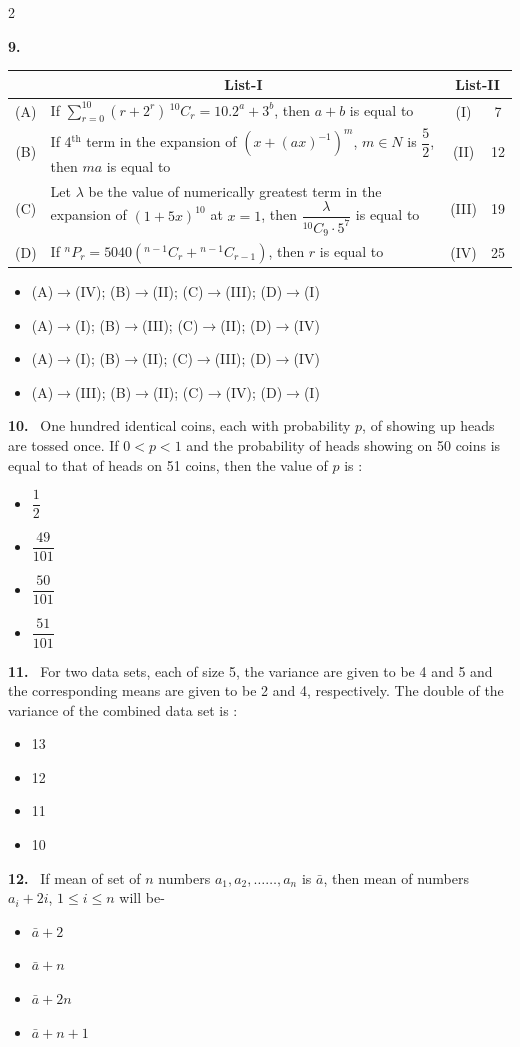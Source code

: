 \documentclass[10pt]{extarticle}
\newcommand{\qn}[1]{\par\smallskip\noindent\textbf{#1.}~}
\newenvironment{qoptions}{\begin{itemize}[leftmargin=1.8em,itemsep=1pt,topsep=2pt,label={}]}{\end{itemize}}
\newcommand{\opt}[2]{\item[(#1)] #2}
\begin{document}
\begin{multicols}{2}
\qn{9}
\begin{center}
\begin{tabular}{|c|p{4.2cm}|c|c|}
\hline
 & \multicolumn{1}{c|}{\textbf{List-I}} & \multicolumn{2}{c|}{\textbf{List-II}}\\
\hline
(A) & If $\displaystyle\sum_{r=0}^{10}(r+2^r)\,{}^{10}C_r=10.2^a+3^b$, then $a+b$ is equal to & (I) & 7\\
\hline
(B) & If 4$^{\text{th}}$ term in the expansion of $(x+(ax)^{-1})^m$, $m\in N$ is $\dfrac52$, then $ma$ is equal to & (II) & 12\\
\hline
(C) & Let $\lambda$ be the value of numerically greatest term in the expansion of $(1+5x)^{10}$ at $x=1$, then $\dfrac{\lambda}{{}^{10}C_9\cdot5^7}$ is equal to & (III) & 19\\
\hline
(D) & If ${}^nP_r=5040\left({}^{n-1}C_r+{}^{n-1}C_{r-1}\right)$, then $r$ is equal to & (IV) & 25\\
\hline
\end{tabular}
\end{center}
\begin{qoptions}
\opt{A}{(A)$\rightarrow$(IV); (B)$\rightarrow$(II); (C)$\rightarrow$(III); (D)$\rightarrow$(I)}
\opt{B}{(A)$\rightarrow$(I); (B)$\rightarrow$(III); (C)$\rightarrow$(II); (D)$\rightarrow$(IV)}
\opt{C}{(A)$\rightarrow$(I); (B)$\rightarrow$(II); (C)$\rightarrow$(III); (D)$\rightarrow$(IV)}
\opt{D}{(A)$\rightarrow$(III); (B)$\rightarrow$(II); (C)$\rightarrow$(IV); (D)$\rightarrow$(I)}
\end{qoptions}

\qn{10} One hundred identical coins, each with probability $p$, of showing up heads are tossed once. If $0<p<1$ and the probability of heads showing on 50 coins is equal to that of heads on 51 coins, then the value of $p$ is :
\begin{qoptions}
\opt{A}{$\dfrac12$}
\opt{B}{$\dfrac{49}{101}$}
\opt{C}{$\dfrac{50}{101}$}
\opt{D}{$\dfrac{51}{101}$}
\end{qoptions}

\qn{11} For two data sets, each of size 5, the variance are given to be 4 and 5 and the corresponding means are given to be 2 and 4, respectively. The double of the variance of the combined data set is :
\begin{qoptions}
\opt{A}{13}
\opt{B}{12}
\opt{C}{11}
\opt{D}{10}
\end{qoptions}

\qn{12} If mean of set of $n$ numbers $a_1,a_2,\ldots\ldots,a_n$ is $\bar a$, then mean of numbers $a_i+2i$, $1\le i\le n$ will be-
\begin{qoptions}
\opt{A}{$\bar a+2$}
\opt{B}{$\bar a+n$}
\opt{C}{$\bar a+2n$}
\opt{D}{$\bar a+n+1$}
\end{qoptions}


\end{multicols}
\end{document}
